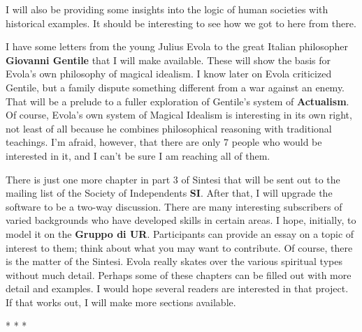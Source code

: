 I will also be providing some insights into the logic of human societies with historical examples. It should be interesting to see how we got to here from there.

I have some letters from the young Julius Evola to the great Italian philosopher \textbf{Giovanni Gentile} that I will make available. These will show the basis for Evola's own philosophy of magical idealism. I know later on Evola criticized Gentile, but a family dispute something different from a war against an enemy. That will be a prelude to a fuller exploration of Gentile's system of \textbf{Actualism}. Of course, Evola's own system of Magical Idealism is interesting in its own right, not least of all because he combines philosophical reasoning with traditional teachings. I'm afraid, however, that there are only 7 people who would be interested in it, and I can't be sure I am reaching all of them.

There is just one more chapter in part 3 of Sintesi that will be sent out to the mailing list of the Society of Independents \textbf{SI}. After that, I will upgrade the software to be a two-way discussion. There are many interesting subscribers of varied backgrounds who have developed skills in certain areas. I hope, initially, to model it on the \textbf{Gruppo di UR}. Participants can provide an essay on a topic of interest to them; think about what you may want to contribute. Of course, there is the matter of the Sintesi. Evola really skates over the various spiritual types without much detail. Perhaps some of these chapters can be filled out with more detail and examples. I would hope several readers are interested in that project. If that works out, I will make more sections available.



\begin{center}* * *\end{center}

